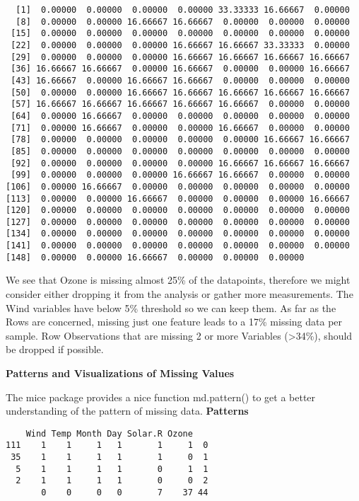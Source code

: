 \documentclass[12pt,]{article}
\begin{document}
\begin{verbatim}
  [1]  0.00000  0.00000  0.00000  0.00000 33.33333 16.66667  0.00000
  [8]  0.00000  0.00000 16.66667 16.66667  0.00000  0.00000  0.00000
 [15]  0.00000  0.00000  0.00000  0.00000  0.00000  0.00000  0.00000
 [22]  0.00000  0.00000  0.00000 16.66667 16.66667 33.33333  0.00000
 [29]  0.00000  0.00000  0.00000 16.66667 16.66667 16.66667 16.66667
 [36] 16.66667 16.66667  0.00000 16.66667  0.00000  0.00000 16.66667
 [43] 16.66667  0.00000 16.66667 16.66667  0.00000  0.00000  0.00000
 [50]  0.00000  0.00000 16.66667 16.66667 16.66667 16.66667 16.66667
 [57] 16.66667 16.66667 16.66667 16.66667 16.66667  0.00000  0.00000
 [64]  0.00000 16.66667  0.00000  0.00000  0.00000  0.00000  0.00000
 [71]  0.00000 16.66667  0.00000  0.00000 16.66667  0.00000  0.00000
 [78]  0.00000  0.00000  0.00000  0.00000  0.00000 16.66667 16.66667
 [85]  0.00000  0.00000  0.00000  0.00000  0.00000  0.00000  0.00000
 [92]  0.00000  0.00000  0.00000  0.00000 16.66667 16.66667 16.66667
 [99]  0.00000  0.00000  0.00000 16.66667 16.66667  0.00000  0.00000
[106]  0.00000 16.66667  0.00000  0.00000  0.00000  0.00000  0.00000
[113]  0.00000  0.00000 16.66667  0.00000  0.00000  0.00000 16.66667
[120]  0.00000  0.00000  0.00000  0.00000  0.00000  0.00000  0.00000
[127]  0.00000  0.00000  0.00000  0.00000  0.00000  0.00000  0.00000
[134]  0.00000  0.00000  0.00000  0.00000  0.00000  0.00000  0.00000
[141]  0.00000  0.00000  0.00000  0.00000  0.00000  0.00000  0.00000
[148]  0.00000  0.00000 16.66667  0.00000  0.00000  0.00000
\end{verbatim}

We see that Ozone is missing almost 25\% of the datapoints, therefore we
might consider either dropping it from the analysis or gather more
measurements. The Wind variables have below 5\% threshold so we can keep
them. As far as the Rows are concerned, missing just one feature leads
to a 17\% missing data per sample. Row Observations that are missing 2
or more Variables (\textgreater{}34\%), should be dropped if possible.

\textbf{Patterns and Visualizations of Missing Values}

The mice package provides a nice function md.pattern() to get a better
understanding of the pattern of missing data. \textbf{Patterns}

\begin{verbatim}
    Wind Temp Month Day Solar.R Ozone   
111    1    1     1   1       1     1  0
 35    1    1     1   1       1     0  1
  5    1    1     1   1       0     1  1
  2    1    1     1   1       0     0  2
       0    0     0   0       7    37 44
\end{verbatim}
\end{document}
